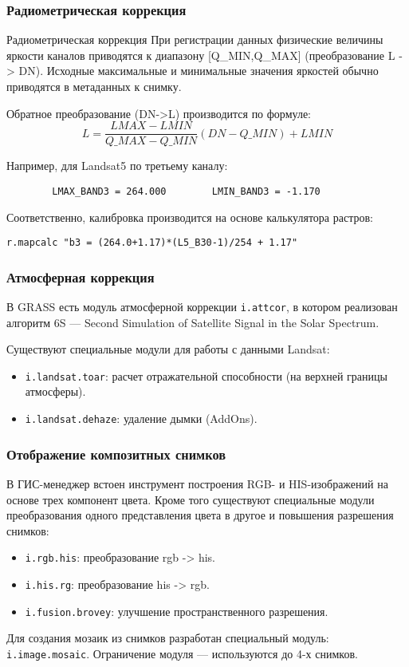 \begin{frame}
    \frametitle{Радиометрическая коррекция}
    \begin{block}{Радиометрическая коррекция}
    При регистрации данных физические величины яркости каналов приводятся к диапазону [Q\_MIN,Q\_MAX] (преобразование L -> DN). Исходные максимальные и минимальные значения яркостей обычно приводятся в метаданных к снимку.

    Обратное преобразование (DN->L) производится по формуле:
    \begin{equation*}
        L = \frac{LMAX - LMIN}{Q\_MAX-Q\_MIN} (DN-Q\_MIN) + LMIN
    \end{equation*}
    \end{block}
    Например, для Landsat5 по третьему каналу:
    \begin{lstlisting}
        LMAX_BAND3 = 264.000        LMIN_BAND3 = -1.170
    \end{lstlisting}
    Соответственно, калибровка производится на основе калькулятора растров:
    \begin{lstlisting}
r.mapcalc "b3 = (264.0+1.17)*(L5_B30-1)/254 + 1.17"
    \end{lstlisting}
\end{frame}

\begin{frame}[fragile]
    \frametitle{Атмосферная коррекция}
    В GRASS есть модуль атмосферной коррекции \lstinline!i.attcor!, в котором реализован алгоритм 6S --- Second Simulation of Satellite Signal in the Solar Spectrum.

    Существуют специальные модули для работы с данными Landsat:
    \begin{itemize}
        \item \lstinline!i.landsat.toar!: расчет отражательной способности (на верхней границы атмосферы).
        \item \lstinline!i.landsat.dehaze!: удаление дымки (AddOns).
    \end{itemize}
\end{frame}

\begin{frame}
    \frametitle{Отображение композитных снимков}
    В ГИС-менеджер встоен инструмент построения RGB- и HIS-изображений на основе трех компонент цвета. Кроме того существуют специальные модули преобразования одного представления цвета в другое и повышения разрешения снимков:
    \begin{itemize}
        \item \lstinline!i.rgb.his!: преобразование rgb -> his.
        \item \lstinline!i.his.rg!: преобразование his -> rgb.
        \item \lstinline!i.fusion.brovey!: улучшение пространственного разрешения.
    \end{itemize}

    Для создания мозаик из снимков разработан специальный модуль: \lstinline!i.image.mosaic!. Ограничение модуля --- используются до 4-х снимков.
\end{frame}


